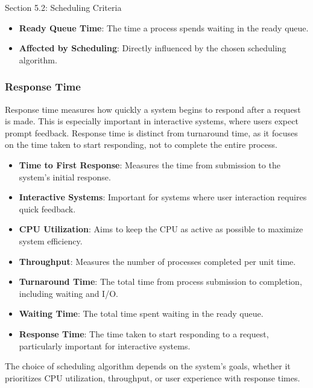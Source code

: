 \begin{notes}{Section 5.2: Scheduling Criteria}
\begin{highlight}
        \begin{itemize}
            \item \textbf{Ready Queue Time}: The time a process spends waiting in the ready queue.
            \item \textbf{Affected by Scheduling}: Directly influenced by the chosen scheduling algorithm.
        \end{itemize}
    
    \end{highlight}
    
    \subsubsection*{Response Time}
    
    Response time measures how quickly a system begins to respond after a request is made. This is especially important in interactive systems, where users expect prompt feedback. Response time is distinct from 
    turnaround time, as it focuses on the time taken to start responding, not to complete the entire process.
    
    \begin{highlight}
    
        \begin{itemize}
            \item \textbf{Time to First Response}: Measures the time from submission to the system's initial response.
            \item \textbf{Interactive Systems}: Important for systems where user interaction requires quick feedback.
        \end{itemize}
    
    \end{highlight}
    
    \begin{highlight}
    
        \begin{itemize}
            \item \textbf{CPU Utilization}: Aims to keep the CPU as active as possible to maximize system efficiency.
            \item \textbf{Throughput}: Measures the number of processes completed per unit time.
            \item \textbf{Turnaround Time}: The total time from process submission to completion, including waiting and I/O.
            \item \textbf{Waiting Time}: The total time spent waiting in the ready queue.
            \item \textbf{Response Time}: The time taken to start responding to a request, particularly important for interactive systems.
        \end{itemize}
    
    The choice of scheduling algorithm depends on the system's goals, whether it prioritizes CPU utilization, throughput, or user experience with response times.
    
    \end{highlight}
\end{notes}

